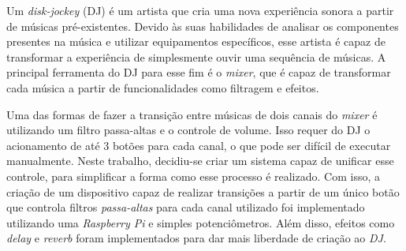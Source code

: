 \begin{resumo}

    Um \textit{disk-jockey} (DJ) é um artista que cria uma nova experiência sonora a partir de músicas pré-existentes. Devido às suas habilidades de analisar os componentes presentes na música e utilizar equipamentos específicos, esse artista é capaz de transformar a experiência de simplesmente ouvir uma sequência de músicas.
    A principal ferramenta do DJ para esse fim é o \textit{mixer}, que é capaz de transformar cada música a partir de funcionalidades como filtragem e efeitos.


    Uma das formas de fazer a transição entre músicas de dois canais do \textit{mixer} é utilizando um filtro passa-altas e o controle de volume. Isso requer do DJ o acionamento de até 3 botões para cada canal, o que pode ser difícil de executar manualmente. Neste trabalho, decidiu-se criar um sistema capaz de unificar esse controle, para simplificar a forma como esse processo é realizado.
    Com isso, a criação de um dispositivo capaz de realizar transições a partir de um único botão que controla filtros \textit{passa-altas} para cada canal utilizado foi implementado utilizando uma \textit{Raspberry Pi} e simples potenciômetros. Além disso, efeitos como \textit{delay} e \textit{reverb} foram implementados para dar mais liberdade de criação ao \textit{DJ}.
    
    

\end{resumo}
